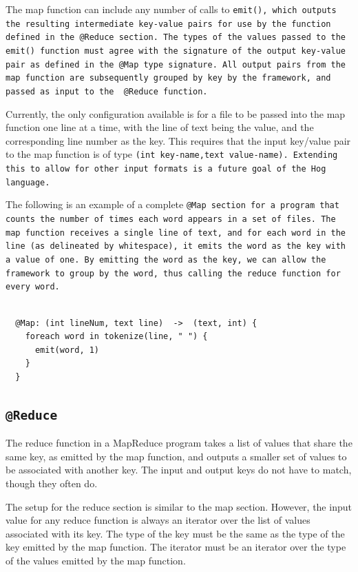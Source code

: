 \documentclass{article}
\begin{document}
The map function can include any number of calls to \tt emit()\rm, which outputs
the resulting intermediate key-value pairs for use by the function defined in the
\tt @Reduce \rm section. The types of the values passed to the \tt emit() \rm
function must agree with the signature of the output key-value pair as defined in
the \tt @Map \rm type signature. All output pairs from the map function are
subsequently grouped by key by the framework, and passed as input to the \tt
@Reduce \rm function.

Currently, the only configuration available is for a file to be passed into the map
function one line at a time, with the line of text being the value, and the
corresponding line number as the key. This requires that the input key/value pair
to the map function is of type \tt (int key‐name,text value‐name)\rm. Extending
this to allow for other input formats is a future goal of the Hog language.

The following is an example of a complete \tt @Map \rm section for a program that
counts the number of times each word appears in a set of files. The map function
receives a single line of text, and for each word in the line (as delineated by
whitespace), it emits the word as the key with a value of one. By emitting the word
as the key, we can allow the framework to group by the word, thus calling the
reduce function for every word.

\begin{verbatim}

  @Map: (int lineNum, text line)  ->  (text, int) {
    foreach word in tokenize(line, " ") {
      emit(word, 1)
    }
  }

\end{verbatim}



\subsection{\tt @Reduce \rm} %
\label{sub:tt_reduce_rm}

The reduce function in a MapReduce program takes a list of values that share the
same key, as emitted by the map function, and outputs a smaller set of values to
be associated with another key. The input and output keys do not have to match,
though they often do.

The setup for the reduce section is similar to the map section. However, the input
value for any reduce function is always an iterator over the list of values
associated with its key. The type of the key must be the same as the type of the
key emitted by the map function. The iterator must be an iterator over the type of
the values emitted by the map function.
\end{document}
